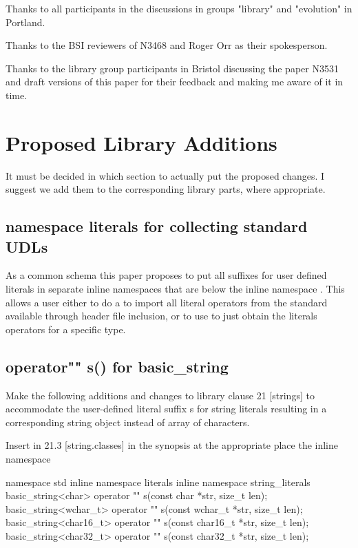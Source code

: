 \documentclass[ebook,11pt,article]{memoir}
\begin{document}
Thanks to all participants in the discussions in groups "library" and "evolution" in Portland.

Thanks to the BSI reviewers of N3468 and Roger Orr as their spokesperson.

Thanks to the library group participants in Bristol discussing the paper N3531 and draft versions of this paper for their feedback and making me aware of it in time.
\chapter{Proposed Library Additions}
It must be decided in which section to actually put the proposed changes. I suggest we add them to the corresponding library parts, where appropriate.


\section{namespace literals for collecting standard UDLs}
As a common schema this paper proposes to put all suffixes for user defined literals in separate inline namespaces that are below the inline namespace . 
\enternote
This allows a user either to do a  to import all literal operators from the standard available through header file inclusion, or to use  to just obtain the literals operators for a specific type.
\exitnote



\section{operator"" s() for basic_string}
Make the following additions and changes to library clause 21 [strings] to accommodate the user-defined literal suffix s for string literals resulting in a corresponding string object instead of array of characters.

Insert in 21.3 [string.classes] in the synopsis at the appropriate place the inline namespace 
\begin{codeblock}
namespace std{
inline namespace literals{
inline namespace string_literals{
basic_string<char> operator "" s(const char *str, size_t len);
basic_string<wchar_t> operator "" s(const wchar_t *str, size_t len);
basic_string<char16_t> operator "" s(const char16_t *str, size_t len);
basic_string<char32_t> operator "" s(const char32_t *str, size_t len);
}}}
\end{codeblock}
\end{document}

